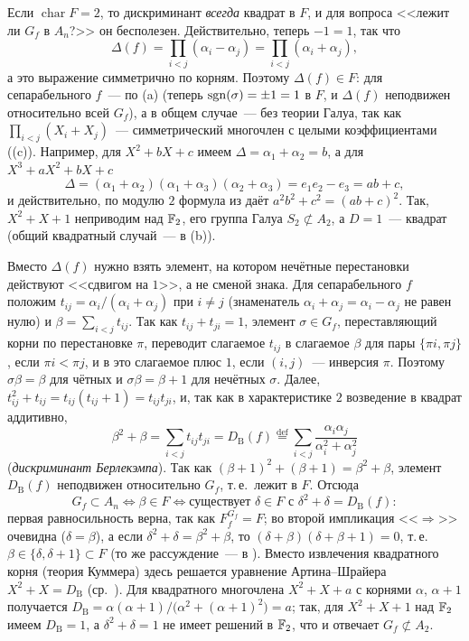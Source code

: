 \begin{aside}[4.4]
Если $\operatorname{char}F=2$, то дискриминант \emph{всегда} квадрат в $F$, и для вопроса <<лежит ли $G_f$ в $A_n$?>> он
бесполезен. Действительно, теперь $-1=1$, так что
\[
\Delta(f)=\prod_{i<j}(\alpha_i-\alpha_j)=\prod_{i<j}(\alpha_i+\alpha_j),
\]
а это выражение симметрично по корням. Поэтому $\Delta(f)\in F$: для сепарабельного $f$~--- по (a) (теперь
$\operatorname{sgn}(\sigma)=\pm1=1$ в $F$, и $\Delta(f)$ неподвижен относительно всей $G_f$), а в общем случае~--- без теории Галуа, так как
$\prod_{i<j}(X_i+X_j)$~--- симметрический многочлен с целыми коэффициентами ((c)). Например, для $X^2+bX+c$ имеем
$\Delta=\alpha_1+\alpha_2=b$, а для $X^3+aX^2+bX+c$
\[
\Delta=(\alpha_1+\alpha_2)(\alpha_1+\alpha_3)(\alpha_2+\alpha_3)=e_1e_2-e_3=ab+c,
\]
и действительно, по модулю $2$ формула из  даёт $a^2b^2+c^2=(ab+c)^2$. Так, $X^2+X+1$ неприводим над $\mathbb F_2$, его
группа Галуа $S_2\not\subset A_2$, а $D=1$~--- квадрат (общий квадратный случай~--- в (b)).

Вместо $\Delta(f)$ нужно взять элемент, на котором нечётные перестановки действуют <<сдвигом на $1$>>, а не сменой знака.
Для сепарабельного $f$ положим $t_{ij}=\alpha_i/(\alpha_i+\alpha_j)$ при $i\ne j$ (знаменатель $\alpha_i+\alpha_j=\alpha_i-\alpha_j$
не равен нулю) и $\beta=\sum_{i<j}t_{ij}$. Так как $t_{ij}+t_{ji}=1$, элемент $\sigma\in G_f$, переставляющий корни по
перестановке $\pi$, переводит слагаемое $t_{ij}$ в слагаемое $\beta$ для пары $\{\pi i,\pi j\}$, если $\pi i<\pi j$, и в это
слагаемое плюс $1$, если $(i,j)$~--- инверсия $\pi$. Поэтому $\sigma\beta=\beta$ для чётных и $\sigma\beta=\beta+1$ для нечётных
$\sigma$. Далее, $t_{ij}^2+t_{ij}=t_{ij}(t_{ij}+1)=t_{ij}t_{ji}$, и, так как в характеристике $2$ возведение в квадрат
аддитивно,
\[
\beta^2+\beta=\sum_{i<j}t_{ij}t_{ji}=D_{\mathrm B}(f)\overset{\mathrm{def}}{=}\sum_{i<j}\frac{\alpha_i\alpha_j}{\alpha_i^2+\alpha_j^2}
\]
(\emph{дискриминант Берлекэмпа}). Так как $(\beta+1)^2+(\beta+1)=\beta^2+\beta$, элемент $D_{\mathrm B}(f)$ неподвижен
относительно $G_f$, т.\,е.\ лежит в $F$. Отсюда
\[
G_f\subset A_n\iff\beta\in F\iff\text{существует }\delta\in F\text{ с }\delta^2+\delta=D_{\mathrm B}(f):
\]
первая равносильность верна, так как $F_f^{G_f}=F$; во второй импликация <<$\Rightarrow$>> очевидна ($\delta=\beta$), а
если $\delta^2+\delta=\beta^2+\beta$, то $(\delta+\beta)(\delta+\beta+1)=0$, т.\,е.\ $\beta\in\{\delta,\delta+1\}\subset F$
(то же рассуждение~--- в ). Вместо
извлечения квадратного корня (теория Куммера) здесь решается уравнение Артина--Шрайера $X^2+X=D_{\mathrm B}$
(ср.\ ). Для квадратного многочлена $X^2+X+a$ с корнями $\alpha$, $\alpha+1$ получается
$D_{\mathrm B}=\alpha(\alpha+1)/\bigl(\alpha^2+(\alpha+1)^2\bigr)=a$; так, для $X^2+X+1$ над $\mathbb F_2$ имеем $D_{\mathrm B}=1$, а
$\delta^2+\delta=1$ не имеет решений в $\mathbb F_2$, что и отвечает $G_f\not\subset A_2$.
\end{aside}

